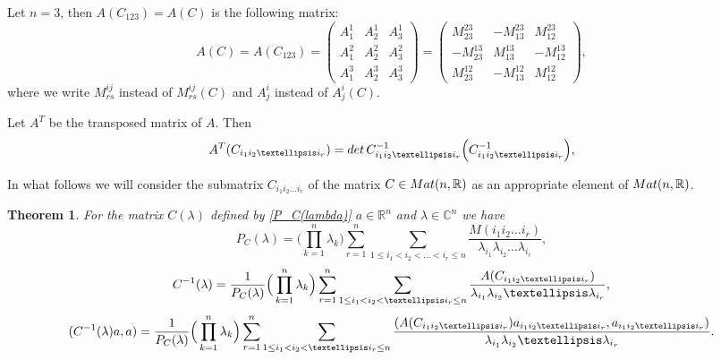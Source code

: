 \documentclass[preprint,12pt]{elsarticle}
\newtheorem{thm}{Theorem}[section]
\numberwithin{equation}{section}
\begin{document}
Let $n=3$, then $A(C_{123})=A(C)$ is the following matrix: 
\begin{equation}
 \label{A(C)3}
A(C)=A(C_{123})=
\left(
\begin{array}{ccc}
A^1_1&A^1_2&A^1_3\\
A^2_1&A^2_2&A^2_3\\
A^3_1&A^3_2&A^3_3
\end{array}
\right)=
\left(
\begin{array}{ccc}
M^{23}_{23}&-M^{23}_{13}&M^{23}_{12}\\
-M^{13}_{23}&M^{13}_{13}&-M^{13}_{12}\\
M^{12}_{23}&-M^{12}_{13}&M^{12}_{12}
\end{array}
\right),
\end{equation}
where we write $M^{ij}_{rs}$ instead of $M^{ij}_{rs}(C)$ and $A^i_j$ instead of $A^i_j(C)$.
%
\begin{rem}
\label{r.C_{12}=}
Let $A^T$ be the transposed matrix
of $A$. Then
\begin{equation}
 \label{A(C_{12})=}
A^T(C_{i_1i_2\dots i_r})={\rm det}\,C^{-1}_{i_1i_2\dots i_r}\Big(C^{-1}_{i_1i_2\dots i_r}\Big),
\end{equation}

\end{rem}
%
In what follows we will  consider the submatrix $C_{i_1i_2\dots i_r}$ of the matrix $C\in {\rm Mat}(n,\mathbb R)$ as an appropriate element of ${\rm Mat}(n,\mathbb R)$.
%
\begin{thm}
\label{t.(C^{-1}a,a)}
 For the matrix $C(\lambda)$ defined by  \eqref{P_C(lambda)} 
 $a\in \mathbb R^n$  and $\lambda\in \mathbb C^n$ we have 
 {\small
   \begin{equation}
 \label{Del_n(lam,C)}
 P_C(\lambda)=
 \Big(\prod_{k=1}^n\lambda_k\Big)\sum_{r=1}^n
\sum_{1\leq i_1<i_2<\dots <i_r\leq n}
\frac{M(i_1i_2\dots i_r)}{\lambda_{i_1}\lambda_{i_2}\dots \lambda_{ i_r}},
\end{equation}
 \begin{equation}
 \label{C^{-1}(lam)}
C^{-1}(\lambda)=\frac{1}{P_C(\lambda)}\Big(\prod_{k=1}^n\lambda_k\Big)
\sum_{r=1}^n
\sum_{1\leq i_1<i_2<\dots i_r\leq n}
\frac{A(C_{i_1i_2\dots i_r})}{\lambda_{i_1}\lambda_{i_2}\dots \lambda_{ i_r}},
 \end{equation} 
 \begin{equation}
 \label{(C^{-1}(lam)a,a)}
(C^{-1}(\lambda)a,a)=\frac{1}{P_C(\lambda)}\Big(\prod_{k=1}^n\lambda_k\Big)
\sum_{r=1}^n
\sum_{1\leq i_1<i_2<\dots i_r\leq n}
\frac{(A(C_{i_1i_2\dots i_r})a_{i_1i_2\dots i_r},a_{i_1i_2\dots i_r})}{\lambda_{i_1}\lambda_{i_2}\dots \lambda_{ i_r}}.
 \end{equation}
 }
\end{thm}
\end{document}
